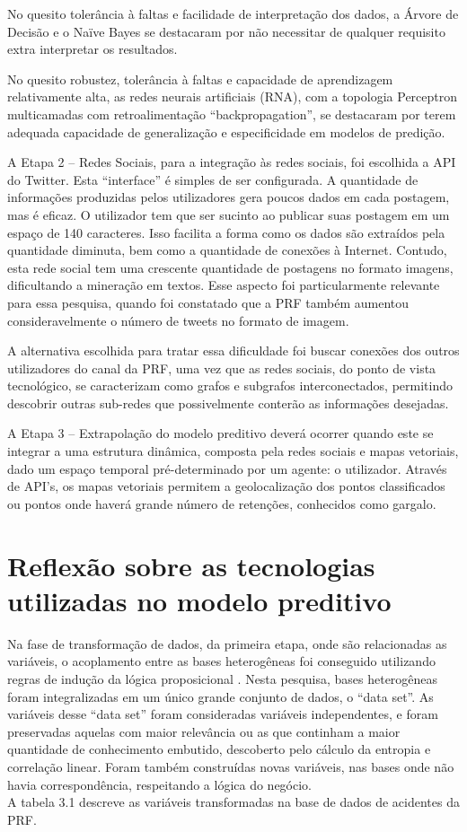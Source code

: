 No quesito tolerância à faltas e facilidade de interpretação dos dados, a Árvore de Decisão e o Naïve Bayes se destacaram por não necessitar de qualquer requisito extra interpretar os resultados.

No quesito robustez, tolerância à faltas e capacidade de aprendizagem relativamente alta, as redes neurais artificiais (RNA), com a topologia Perceptron multicamadas com retroalimentação ``backpropagation'', se destacaram por terem adequada capacidade de generalização e especificidade em modelos de predição. 

A Etapa 2 -- Redes Sociais, para a integração às redes sociais, foi escolhida a API do Twitter. Esta ``interface'' é simples de ser configurada. A quantidade de informações produzidas pelos utilizadores gera poucos dados em cada postagem, mas é eficaz. O utilizador tem que ser sucinto ao publicar suas postagem em um espaço de 140 caracteres. Isso facilita a forma como os dados são extraídos pela quantidade diminuta, bem como a quantidade de conexões à Internet. Contudo, esta rede social tem uma crescente quantidade de postagens no formato imagens, dificultando a mineração em textos. Esse aspecto foi particularmente relevante para essa pesquisa, quando foi constatado que a PRF também aumentou consideravelmente o número de tweets no formato de imagem. 

A alternativa escolhida para tratar essa dificuldade foi buscar conexões dos outros utilizadores do canal da PRF, uma vez que as redes sociais, do ponto de vista tecnológico, se caracterizam como grafos e subgrafos interconectados, permitindo descobrir outras sub-redes que possivelmente conterão as informações desejadas. 


A Etapa 3 -- Extrapolação do modelo preditivo deverá ocorrer quando este se integrar a uma estrutura dinâmica, composta pela redes sociais e mapas vetoriais, dado um espaço temporal pré-determinado por um agente: o utilizador. 
Através de API's, os mapas vetoriais permitem a geolocalização dos pontos classificados ou pontos onde haverá grande número de retenções, conhecidos como gargalo.


\section{Reflexão sobre as tecnologias utilizadas no modelo preditivo}\label{result}

Na fase de transformação de dados, da primeira etapa, onde são relacionadas as variáveis, o acoplamento  entre as bases heterogêneas foi conseguido utilizando regras de indução da lógica proposicional \cite{NorvigRussel2004}.
Nesta pesquisa, bases heterogêneas foram integralizadas em um único grande conjunto de dados, o ``data set''. As variáveis desse ``data set'' foram consideradas variáveis independentes, e foram  preservadas aquelas com maior relevância ou as que continham a maior quantidade de conhecimento embutido, descoberto pelo cálculo da entropia e correlação linear. Foram também construídas novas variáveis, nas bases onde não havia correspondência, respeitando a lógica do negócio.\\
A tabela 3.1 descreve as variáveis transformadas na base de dados de acidentes da PRF.

